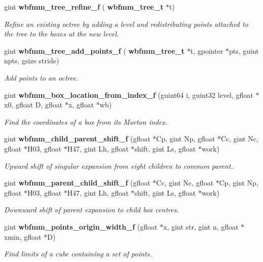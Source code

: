 \begin{DoxyCompactItemize}
gint \textbf{ wbfmm\+\_\+tree\+\_\+refine\+\_\+f} (\textbf{ wbfmm\+\_\+tree\+\_\+t} $\ast$t)
\begin{DoxyCompactList}\small\item\em Refine an existing octree by adding a level and redistributing points attached to the tree to the boxes at the new level. \end{DoxyCompactList}\item 
gint \textbf{ wbfmm\+\_\+tree\+\_\+add\+\_\+points\+\_\+f} (\textbf{ wbfmm\+\_\+tree\+\_\+t} $\ast$t, gpointer $\ast$pts, guint npts, gsize stride)
\begin{DoxyCompactList}\small\item\em Add points to an octree. \end{DoxyCompactList}\item 
gint \textbf{ wbfmm\+\_\+box\+\_\+location\+\_\+from\+\_\+index\+\_\+f} (guint64 i, guint32 level, gfloat $\ast$x0, gfloat D, gfloat $\ast$x, gfloat $\ast$wb)
\begin{DoxyCompactList}\small\item\em Find the coordinates of a box from its Morton index. \end{DoxyCompactList}\item 
gint \textbf{ wbfmm\+\_\+child\+\_\+parent\+\_\+shift\+\_\+f} (gfloat $\ast$Cp, gint Np, gfloat $\ast$Cc, gint Nc, gfloat $\ast$H03, gfloat $\ast$H47, gint Lh, gfloat $\ast$shift, gint Ls, gfloat $\ast$work)
\begin{DoxyCompactList}\small\item\em Upward shift of singular expansion from eight children to common parent. \end{DoxyCompactList}\item 
gint \textbf{ wbfmm\+\_\+parent\+\_\+child\+\_\+shift\+\_\+f} (gfloat $\ast$Cc, gint Nc, gfloat $\ast$Cp, gint Np, gfloat $\ast$H03, gfloat $\ast$H47, gint Lh, gfloat $\ast$shift, gint Ls, gfloat $\ast$work)
\begin{DoxyCompactList}\small\item\em Downward shift of parent expansion to child box centres. \end{DoxyCompactList}\item 
gint \textbf{ wbfmm\+\_\+points\+\_\+origin\+\_\+width\+\_\+f} (gfloat $\ast$x, gint str, gint n, gfloat $\ast$xmin, gfloat $\ast$D)
\begin{DoxyCompactList}\small\item\em Find limits of a cube containing a set of points. \end{DoxyCompactList}\item 

\end{DoxyCompactItemize}
